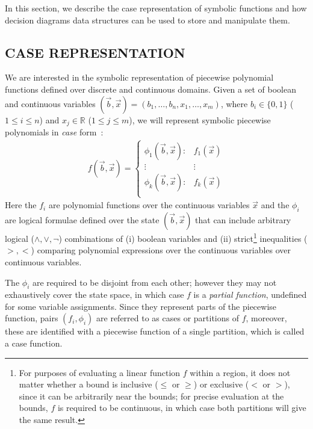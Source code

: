 \label{sec:xadd}

In this section, we describe the case representation of symbolic functions and how decision diagrams data structures can be used to store and manipulate them.

\subsection{CASE REPRESENTATION}

We are interested in the symbolic representation of piecewise polynomial functions defined over discrete and continuous domains. Given a set of boolean and continuous variables $(\vec{b},\vec{x}) = ( b_1,\ldots,b_n,x_{1},\ldots,x_m )$, where $b_i \in \{ 0,1 \}$ ($1 \leq i \leq n$) and $x_j \in \mathbb{R}$ ($1 \leq j \leq m$), we will represent symbolic piecewise polynomials in \emph{case} form~\cite{fomdp}:
{%
\begin{align}
f(\vec{b},\vec{x}) = 
\begin{cases}
  \phi_1(\vec{b},\vec{x}): & f_1(\vec{x}) \\ 
 \vdots&\vdots\\ 
  \phi_k(\vec{b},\vec{x}): & f_k(\vec{x}) \\ 
\end{cases} \label{eq:case}
\end{align}
}
Here the $f_i$ are polynomial functions over the continuous variables $\vec{x}$ and the $\phi_i$ are logical formulae defined over the state $(\vec{b},\vec{x})$ that can include arbitrary logical ($\land,\lor,\neg$) combinations of (i) boolean variables and (ii)  strict\footnote{ For purposes of evaluating a linear function $f$ within a region, it does not matter whether a bound is inclusive ($\leq$ or $\geq$) or exclusive ($<$ or $>$), since it can be arbitrarily near the bounds; for precise evaluation at the bounds, $f$ is required to be continuous, in which case both partitions will give the same result.} inequalities ($>,<$) comparing polynomial expressions over the continuous variables  over continuous variables.  

The $\phi_i$ are required to be disjoint from each other;  however they may not exhaustively cover the state space, in which case $f$ is a \emph{partial function}, undefined for some variable assignments. Since they represent parts of the piecewise function, pairs $(f_i,\phi_i)$ are referred to as cases or partitions of $f$, moreover, these are identified with a piecewise function of a single partition, which is called a case function.

